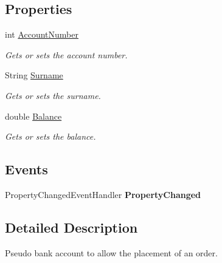 \subsection*{Properties}
\begin{DoxyCompactItemize}
\item 
int \hyperlink{class_application_logic_1_1_model_1_1_bank_account_a26b39785cbc7e1759f90826ae4768c08}{AccountNumber}
\begin{DoxyCompactList}\small\item\em Gets or sets the account number. \item\end{DoxyCompactList}\item 
String \hyperlink{class_application_logic_1_1_model_1_1_bank_account_a3e8b76df7ceea3650f4dff4be49c5997}{Surname}
\begin{DoxyCompactList}\small\item\em Gets or sets the surname. \item\end{DoxyCompactList}\item 
double \hyperlink{class_application_logic_1_1_model_1_1_bank_account_a2630c3acc72bcd9b64ed86ac1cbeb7d0}{Balance}
\begin{DoxyCompactList}\small\item\em Gets or sets the balance. \item\end{DoxyCompactList}\end{DoxyCompactItemize}
\subsection*{Events}
\begin{DoxyCompactItemize}
\item 
\hypertarget{class_application_logic_1_1_model_1_1_bank_account_ab8ba0f0995277fed10983c2967eeb659}{
PropertyChangedEventHandler {\bfseries PropertyChanged}}
\label{class_application_logic_1_1_model_1_1_bank_account_ab8ba0f0995277fed10983c2967eeb659}

\end{DoxyCompactItemize}


\subsection{Detailed Description}
Pseudo bank account to allow the placement of an order. 

